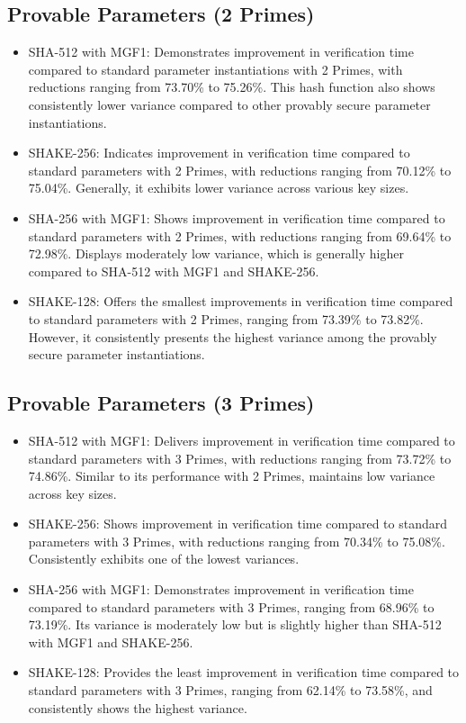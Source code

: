 \documentclass[]{final_report}
\theoremstyle{definition}
\begin{document}
\subsection*{Provable Parameters (2 Primes)}
\begin{itemize}
\item SHA-512 with MGF1: Demonstrates improvement in verification time compared to standard parameter instantiations with 2 Primes, with reductions ranging from 73.70\% to 75.26\%. This hash function also shows consistently lower variance compared to other provably secure parameter instantiations.
\item SHAKE-256: Indicates improvement in verification time compared to standard parameters with 2 Primes, with reductions ranging from 70.12\% to 75.04\%. Generally, it exhibits lower variance across various key sizes.
\item SHA-256 with MGF1: Shows improvement in verification time compared to standard parameters with 2 Primes, with reductions ranging from 69.64\% to 72.98\%. Displays moderately low variance, which is generally higher compared to SHA-512 with MGF1 and SHAKE-256.
\item SHAKE-128: Offers the smallest improvements in verification time compared to standard parameters with 2 Primes, ranging from 73.39\% to 73.82\%. However, it consistently presents the highest variance among the provably secure parameter instantiations.
\end{itemize}

\subsection*{Provable Parameters (3 Primes)}
\begin{itemize}
\item SHA-512 with MGF1: Delivers improvement in verification time compared to standard parameters with 3 Primes, with reductions ranging from 73.72\% to 74.86\%. Similar to its performance with 2 Primes, maintains low variance across key sizes.
\item SHAKE-256: Shows improvement in verification time compared to standard parameters with 3 Primes, with reductions ranging from 70.34\% to 75.08\%. Consistently exhibits one of the lowest variances.
\item SHA-256 with MGF1: Demonstrates improvement in verification time compared to standard parameters with 3 Primes, ranging from 68.96\% to 73.19\%. Its variance is moderately low but is slightly higher than SHA-512 with MGF1 and SHAKE-256.
\item SHAKE-128: Provides the least improvement in verification time compared to standard parameters with 3 Primes, ranging from 62.14\% to 73.58\%, and consistently shows the highest variance.
\end{itemize}
\end{document}
